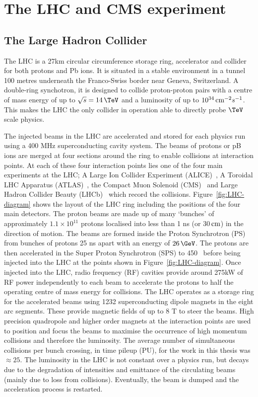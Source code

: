 
\chapter{The LHC and CMS experiment} %
\label{cha:detector}
\section{The Large Hadron Collider}
\label{lhc_intro}
The LHC is a 27km circular circumference storage ring, accelerator and collider for 
both protons and Pb ions. It is situated in a stable environment in a tunnel 
100 metres underneath the Franco-Swiss border near Geneva, Switzerland.
A double-ring synchotron, it is designed to collide proton-proton
pairs with a centre of mass energy of up to $\sqrt{s}=14\,\TeV$ and a 
luminosity of up to $10^{34}\,\text{cm}^{-2}s^{-1}$. This makes the LHC the only collider
in operation able to directly probe $\TeV$ scale physics. 

The injected beams in the LHC are accelerated and stored for each physics run using 
a 400 MHz superconducting cavity system. The beams of protons or pB ions 
are merged at four sections around the ring to enable collisions at interaction points.
At each of these four interaction points lies one of the four main 
experiments at the LHC; A Large Ion Collider Experiment (ALICE)~\cite{ALICE},
A Toroidal LHC Apparatus (ATLAS)~\cite{ATLAS}, the Compact Muon Solenoid (CMS)~\cite{CMS}
and Large Hadron Collider Beauty (LHCb)~\cite{LHCb} which record the collisions. Figure~\ref{fig:LHC-diagram} shows the layout of the LHC ring including
the positions of the four main detectors. The proton beams are made up of many `bunches' of approximately $1.1\times10^{11}$
protons localised into less than 1 ns (or 30$\,\text{cm}$) in the direction of motion.
The beams are formed inside the Proton Synchrotron (PS) from bunches of protons 25 ns apart with an energy of $26\,\GeV$. 
The protons are then accelerated in the Super Proton Synchrotron (SPS) to 450 \GeV~before being injected into the LHC at
the points shown in Figure~\ref{fig:LHC-diagram}. Once injected into the LHC, radio frequency (RF) cavities 
provide around 275kW of RF power independently to each beam to accelerate the protons
to half the operating centre of mass energy for collisions.
The LHC operates as a storage ring for the accelerated beams using 1232 
superconducting dipole magnets in the eight arc segments. These provide magnetic fields of up to 8 T to steer the beams. 
High precision quadropole and higher order magnets at the interaction points are used to position and focus the beams to 
maximise the occurrence of high momentum collisions and therefore the luminosity. The average number of simultaneous collisions
per bunch crossing, in time pileup (PU), for the work in this thesis was $\approx25$.
The luminosity in the LHC is not constant over a physics run, but decays due to the degradation 
of intensities and emittance of the circulating beams (mainly due to loss from collisions). Eventually,
the beam is dumped and the acceleration process is restarted. 

